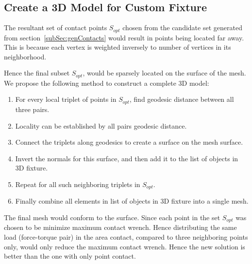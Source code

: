 \subsection{Create a 3D Model for Custom Fixture}
The resultant set of contact points $S_{opt}$ chosen from the candidate set generated 
from section~\ref{subSec:genContacts} would result in points being located far away. This is because each vertex is weighted inversely to number of vertices in its neighborhood.

Hence the final subset $S_{opt}$, would be sparsely located on the surface of the mesh. We propose the following method to construct a complete 3D model:
\begin{enumerate}
\item For every local triplet of points in $S_{opt}$, find geodesic distance between all three pairs. 
\item Locality can be established by all pairs geodesic distance. 
\item Connect the triplets along geodesics to create a surface on the mesh surface. 
\item Invert the normals for this surface, and then add it to the list of objects in 3D fixture. 
\item Repeat for all such neighboring triplets in $S_{opt}$.
\item Finally combine all elements in list of objects in 3D fixture into a single mesh. 
\end{enumerate}

The final mesh would conform to the surface. 
Since each point in the set $S_{opt}$ was chosen to be minimize maximum contact wrench. Hence distributing the same load (force-torque pair) in the area contact, compared to three neighboring points only, would only reduce the maximum contact wrench. Hence the new solution is better than the one with only point contact.